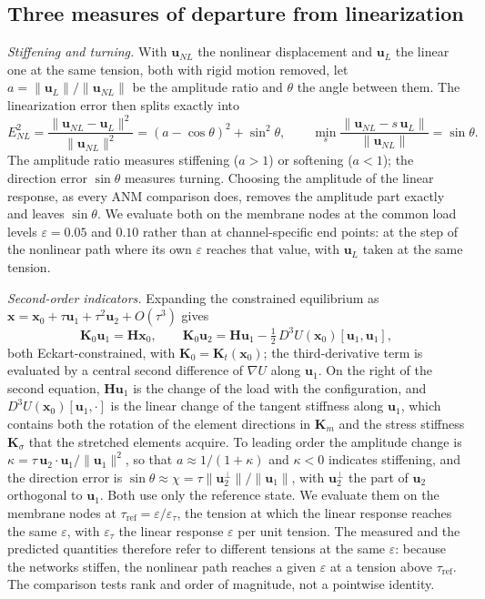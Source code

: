 \documentclass[preprint,12pt,a4paper]{elsarticle}
\newcommand{\x}{\mathbf{x}}
\newcommand{\Kt}{\mathbf{K}_t}
\newcommand{\Hm}{\mathbf{H}}
\newcommand{\eps}{\varepsilon}
\begin{document}
\subsection{Three measures of departure from linearization}
\label{sec:enl}
\label{sec:chi}
\emph{Stiffening and turning.} With $\mathbf{u}_{NL}$ the nonlinear displacement and $\mathbf{u}_L$ the linear one at the same tension, both with rigid motion removed, let $a=\|\mathbf{u}_L\|/\|\mathbf{u}_{NL}\|$ be the amplitude ratio and $\theta$ the angle between them. The linearization error then splits exactly into
\begin{equation}
E_{NL}^2=\frac{\|\mathbf{u}_{NL}-\mathbf{u}_L\|^2}{\|\mathbf{u}_{NL}\|^2}=(a-\cos\theta)^2+\sin^2\theta,
\qquad \min_s\frac{\|\mathbf{u}_{NL}-s\,\mathbf{u}_L\|}{\|\mathbf{u}_{NL}\|}=\sin\theta .
\label{eq:enl}
\end{equation}
The amplitude ratio measures stiffening ($a>1$) or softening ($a<1$); the direction error $\sin\theta$ measures turning. Choosing the amplitude of the linear response, as every ANM comparison does, removes the amplitude part exactly and leaves $\sin\theta$. We evaluate both on the membrane nodes at the common load levels $\eps=0.05$ and $0.10$ rather than at channel-specific end points: at the step of the nonlinear path where its own $\eps$ reaches that value, with $\mathbf{u}_L$ taken at the same tension.

\emph{Second-order indicators.} Expanding the constrained equilibrium as $\x=\x_0+\tau\mathbf{u}_1+\tau^2\mathbf{u}_2+O(\tau^3)$ gives
\begin{equation}
\mathbf{K}_0\mathbf{u}_1=\Hm\x_0,\qquad
\mathbf{K}_0\mathbf{u}_2=\Hm\mathbf{u}_1-\tfrac12\,D^3U(\x_0)[\mathbf{u}_1,\mathbf{u}_1],
\label{eq:pert}
\end{equation}
both Eckart-constrained, with $\mathbf{K}_0=\Kt(\x_0)$; the third-derivative term is evaluated by a central second difference of $\nabla U$ along $\mathbf{u}_1$. On the right of the second equation, $\Hm\mathbf{u}_1$ is the change of the load with the configuration, and $D^3U(\x_0)[\mathbf{u}_1,\cdot]$ is the linear change of the tangent stiffness along $\mathbf{u}_1$, which contains both the rotation of the element directions in $\mathbf{K}_m$ and the stress stiffness $\mathbf{K}_\sigma$ that the stretched elements acquire. To leading order the amplitude change is $\kappa=\tau\,\mathbf{u}_2\cdot\mathbf{u}_1/\|\mathbf{u}_1\|^2$, so that $a\approx1/(1+\kappa)$ and $\kappa<0$ indicates stiffening, and the direction error is $\sin\theta\approx\chi=\tau\|\mathbf{u}_2^{\perp}\|/\|\mathbf{u}_1\|$, with $\mathbf{u}_2^{\perp}$ the part of $\mathbf{u}_2$ orthogonal to $\mathbf{u}_1$. Both use only the reference state. We evaluate them on the membrane nodes at $\tau_{\mathrm{ref}}=\eps/\eps_\tau$, the tension at which the linear response reaches the same $\eps$, with $\eps_\tau$ the linear response $\eps$ per unit tension. The measured and the predicted quantities therefore refer to different tensions at the same $\eps$: because the networks stiffen, the nonlinear path reaches a given $\eps$ at a tension above $\tau_{\mathrm{ref}}$. The comparison tests rank and order of magnitude, not a pointwise identity.
\end{document}
